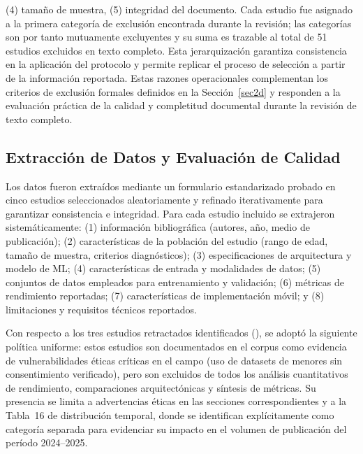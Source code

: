 \documentclass[3p,twocolumn,times]{elsarticle}
\begin{document}
\begin{table}[!ht]
\begin{minipage}{\textwidth}
			(4) tamaño de muestra, (5) integridad del documento. Cada estudio fue asignado a
			la primera categoría de exclusión encontrada durante la revisión; las categorías
			son por tanto mutuamente excluyentes y su suma es trazable al total de 51 estudios
			excluidos en texto completo. Esta jerarquización garantiza consistencia en la
			aplicación del protocolo y permite replicar el proceso de selección a partir de
			la información reportada. Estas razones operacionales complementan los criterios de exclusión formales definidos en la Sección~\ref{sec2d} y responden a la evaluación práctica de la calidad y completitud documental durante la revisión de texto completo.
		\end{minipage}
	\end{table}
	
	\subsection{Extracción de Datos y Evaluación de Calidad}\label{sec2f}
	
	Los datos fueron extraídos mediante un formulario estandarizado probado en cinco
	estudios seleccionados aleatoriamente y refinado iterativamente para garantizar
	consistencia e integridad. Para cada estudio incluido se extrajeron
	sistemáticamente: (1) información bibliográfica (autores, año, medio de
	publicación); (2) características de la población del estudio (rango de edad,
	tamaño de muestra, criterios diagnósticos); (3) especificaciones de arquitectura
	y modelo de ML; (4) características de entrada y modalidades de datos; (5)
	conjuntos de datos empleados para entrenamiento y validación; (6) métricas de
	rendimiento reportadas; (7) características de implementación móvil; y (8)
	limitaciones y requisitos técnicos reportados.
	
	Con respecto a los tres estudios retractados identificados
	(\cite{Gungor2025,Mahmood2025,Kumar2024}), se adoptó la siguiente política
	uniforme: estos estudios son documentados en el corpus como evidencia de
	vulnerabilidades éticas críticas en el campo (uso de datasets de menores sin
	consentimiento verificado), pero son excluidos de todos los análisis cuantitativos
	de rendimiento, comparaciones arquitectónicas y síntesis de métricas. Su presencia
	se limita a advertencias éticas en las secciones correspondientes y a la Tabla~16
	de distribución temporal, donde se identifican explícitamente como categoría
	separada para evidenciar su impacto en el volumen de publicación del período
	2024--2025.
	
\end{document}
